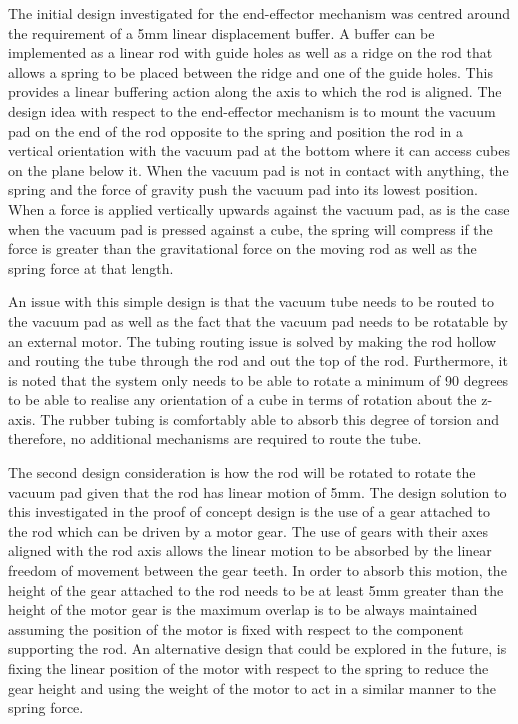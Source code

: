 The initial design investigated for the end-effector mechanism was centred around the requirement of a 5mm linear displacement buffer. A buffer can be implemented as a linear rod with guide holes as well as a ridge on the rod that allows a spring to be placed between the ridge and one of the guide holes. This provides a linear buffering action along the axis to which the rod is aligned. The design idea with respect to the end-effector mechanism is to mount the vacuum pad on the end of the rod opposite to the spring and position the rod in a vertical orientation with the vacuum pad at the bottom where it can access cubes on the plane below it. When the vacuum pad is not in contact with anything, the spring and the force of gravity push the vacuum pad into its lowest position. When a force is applied vertically upwards against the vacuum pad, as is the case when the vacuum pad is pressed against a cube, the spring will compress if the force is greater than the gravitational force on the moving rod as well as the spring force at that length.

An issue with this simple design is that the vacuum tube needs to be routed to the vacuum pad as well as the fact that the vacuum pad needs to be rotatable by an external motor. The tubing routing issue is solved by making the rod hollow and routing the tube through the rod and out the top of the rod. Furthermore, it is noted that the system only needs to be able to rotate a minimum of 90 degrees to be able to realise any orientation of a cube in terms of rotation about the z-axis. The rubber tubing is comfortably able to absorb this degree of torsion and therefore, no additional mechanisms are required to route the tube.

The second design consideration is how the rod will be rotated to rotate the vacuum pad given that the rod has linear motion of 5mm. The design solution to this investigated in the proof of concept design is the use of a gear attached to the rod which can be driven by a motor gear. The use of gears with their axes aligned with the rod axis allows the linear motion to be absorbed by the linear freedom of movement between the gear teeth. In order to absorb this motion, the height of the gear attached to the rod needs to be at least 5mm greater than the height of the motor gear is the maximum overlap is to be always maintained assuming the position of the motor is fixed with respect to the component supporting the rod. An alternative design that could be explored in the future, is fixing the linear position of the motor with respect to the spring to reduce the gear height and using the weight of the motor to act in a similar manner to the spring force.

